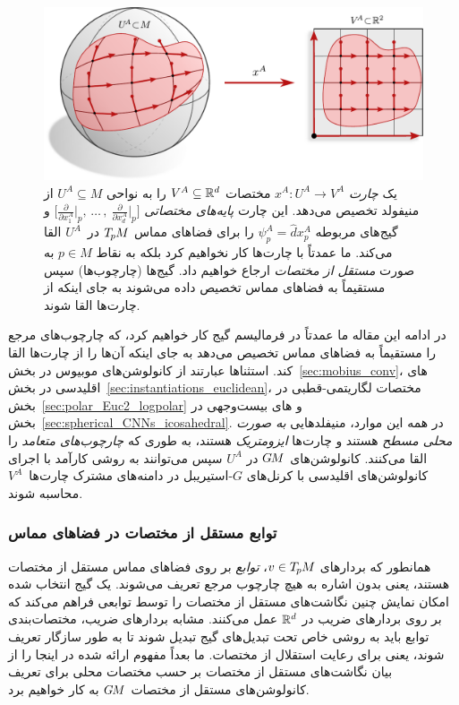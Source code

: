 \begin{figure}
	\centering
	\includegraphics[width=.86\textwidth]{figures/sphere_chart.pdf}
	\hspace*{4ex}
	\caption{\small
		یک \emph{چارت} $x^A: U^A \to V^A$ مختصات $V^A \subseteq \mathbb{R}^d$ را به نواحی $U^A \subseteq M$ از منیفولد تخصیص می‌دهد.
		این چارت \emph{پایه‌های مختصاتی}
		$\big[\frac{\partial}{\partial x^A_1} \big|_p ,\,\dots\,,\ \frac{\partial}{\partial x^A_d} \big|_p \big]$
		و گیج‌های مربوطه $\psi_p^A = \hat{d}x_p^A$ را برای فضاهای مماس $T_{\mkern-1.5mu p}\mkern-.5muM$ در~$U^A$ القا می‌کند.
		ما عمدتاً با چارت‌ها کار نخواهیم کرد بلکه به نقاط $p\in M$ به صورت \emph{مستقل از مختصات} ارجاع خواهیم داد.
		گیج‌ها (چارچوب‌ها) سپس مستقیماً به فضاهای مماس تخصیص داده می‌شوند به جای اینکه از چارت‌ها القا شوند.
	}
	\label{fig:sphere_chart}
\end{figure}


در ادامه این مقاله ما عمدتاً در فرمالیسم گیج کار خواهیم کرد، که چارچوب‌های مرجع را مستقیماً به فضاهای مماس تخصیص می‌دهد به جای اینکه آن‌ها را از چارت‌ها القا کند.
استثناها عبارتند از
کانولوشن‌های موبیوس در بخش~\ref{sec:mobius_conv}،
\CNN{}های اقلیدسی در بخش~\ref{sec:instantiations_euclidean}،
مختصات لگاریتمی-قطبی در بخش~\ref{sec:polar_Euc2_logpolar}
و \CNN{}های بیست‌وجهی در بخش~\ref{sec:spherical_CNNs_icosahedral}.
در همه این موارد، منیفلدهایی \emph{به صورت محلی مسطح} هستند و چارت‌ها \emph{ایزومتریک} هستند، به طوری که \emph{چارچوب‌های متعامد} را القا می‌کنند.
کانولوشن‌های $G\mkern-1.4muM$ در $U^A$ سپس می‌توانند به روشی کارآمد با اجرای کانولوشن‌های اقلیدسی با کرنل‌های $G$-استیریبل در دامنه‌های مشترک چارت‌ها~$V^A$ محاسبه شوند.


\subsubsection{توابع مستقل از مختصات در فضاهای مماس}
\label{sec:gauges_TpM_functions}

همانطور که بردارهای $v\in T_{\mkern-1.5mu p}\mkern-.5muM$، \emph{توابع} بر روی فضاهای مماس مستقل از مختصات هستند، یعنی بدون اشاره به هیچ چارچوب مرجع تعریف می‌شوند.
یک گیج انتخاب شده امکان نمایش چنین نگاشت‌های مستقل از مختصات را توسط توابعی فراهم می‌کند که بر روی بردارهای ضریب در $\mathbb{R}^d$ عمل می‌کنند.
مشابه بردارهای ضریب، مختصات‌بندی توابع باید به روشی خاص تحت تبدیل‌های گیج تبدیل شوند تا به طور سازگار تعریف شوند، یعنی برای رعایت استقلال از مختصات.
ما بعداً مفهوم ارائه شده در اینجا را از بیان نگاشت‌های مستقل از مختصات بر حسب مختصات محلی برای تعریف کانولوشن‌های مستقل از مختصات $G\mkern-1.4muM$ به کار خواهیم برد.

